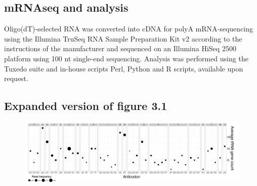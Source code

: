 \documentclass[12pt]{rockefeller}
\begin{document}
\section{mRNAseq and analysis}
Oligo(dT)-selected RNA was converted into cDNA for polyA mRNA-sequencing using the Illumina TruSeq RNA Sample Preparation Kit v2 according to the instructions of the manufacturer and sequenced on an Illumina HiSeq 2500 platform using 100 nt single-end sequencing. Analysis was performed using the Tuxedo suite \cite{Trapnell:2012kp} and in-house scripts Perl, Python and R scripts, available upon request. 

%
%

\renewcommand{\bibname}{References}
\printbibliography
{} %

\begin{appendix}
\newpage
\chapter{Expanded version of figure 3.1}\label{app}
\begin{figure}[!ht]%
\centering
\includegraphics[angle = 90, scale = 1.1]{paper4D.png}%
\centering
%
\end{figure}
\end{appendix}
\end{document}
